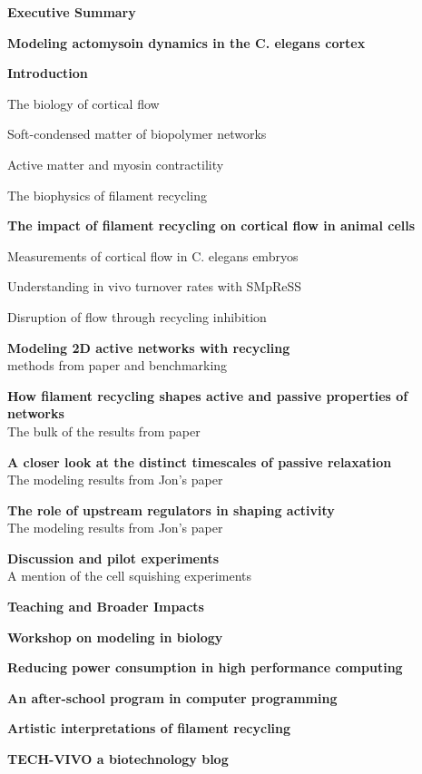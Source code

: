 \documentclass{report}
\begin{document}
\begin{outline}
  \item {\bf Executive Summary }
  \item {\bf Modeling actomysoin dynamics in the C. elegans cortex }
  \begin{outline}
    \item {\bf Introduction }
    \begin{outline}
      \item The biology of cortical flow 
      \item Soft-condensed matter of biopolymer networks
      \item Active matter and myosin contractility 
      \item The biophysics of filament recycling
    \end{outline}
    \item {\bf The impact of filament recycling on cortical flow in animal cells} 
    \begin{outline}
      \item Measurements of cortical flow in C. elegans embryos
      \item Understanding in vivo turnover rates with SMpReSS
      \item Disruption of flow through recycling inhibition
    \end{outline}
    \item {\bf Modeling 2D active networks with recycling } \\
      methods from paper and benchmarking 
    \item {\bf How filament recycling shapes active and passive properties of networks} \\
      The bulk of the results from paper
     \item {\bf A closer look at the distinct timescales of passive relaxation} \\
      The modeling results from Jon's paper
    \item {\bf The role of upstream regulators in shaping activity} \\
      The modeling results from Jon's paper
    \item {\bf Discussion and pilot experiments} \\
      A mention of the cell squishing experiments
  \end{outline}
  \item {\bf Teaching and Broader Impacts}
  \begin{outline}
    \item {\bf Workshop on modeling in biology } \\
    \item {\bf Reducing power consumption in high performance computing } \\
    \item {\bf An after-school program in computer programming } \\
    \item {\bf Artistic interpretations of filament recycling } \\
    \item {\bf TECH-VIVO a biotechnology blog } \\
      

\end{outline}
\end{outline}
\end{document}
